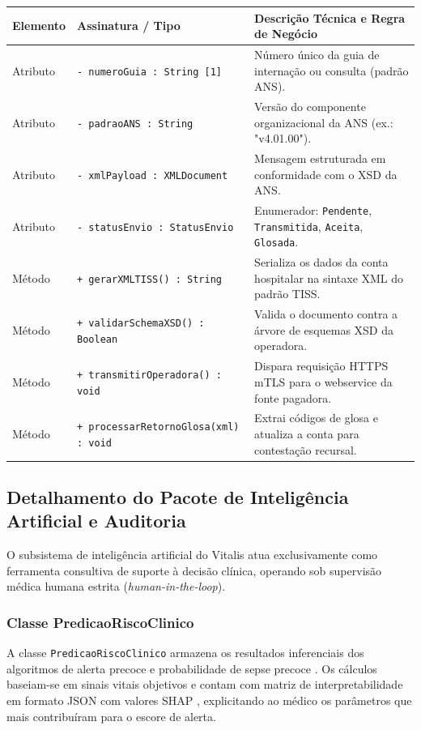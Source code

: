 \begingroup
\small
\noindent\begin{tabularx}{\linewidth}{l >{\raggedright\arraybackslash}p{5.7cm} >{\raggedright\arraybackslash}X}
\toprule
\textbf{Elemento} & \textbf{Assinatura / Tipo} & \textbf{Descrição Técnica e Regra de Negócio} \\
\midrule
Atributo & \texttt{- numeroGuia : String [1]} & Número único da guia de internação ou consulta (padrão ANS). \\
Atributo & \texttt{- padraoANS : String} & Versão do componente organizacional da ANS (ex.: "v4.01.00"). \\
Atributo & \texttt{- xmlPayload : XMLDocument} & Mensagem estruturada em conformidade com o XSD da ANS. \\
Atributo & \texttt{- statusEnvio : StatusEnvio} & Enumerador: \texttt{Pendente}, \texttt{Transmitida}, \texttt{Aceita}, \texttt{Glosada}. \\
\midrule
Método & \texttt{+ gerarXMLTISS() : String} & Serializa os dados da conta hospitalar na sintaxe XML do padrão TISS. \\
Método & \texttt{+ validarSchemaXSD() : Boolean} & Valida o documento contra a árvore de esquemas XSD da operadora. \\
Método & \texttt{+ transmitirOperadora() : void} & Dispara requisição HTTPS mTLS para o webservice da fonte pagadora. \\
Método & \texttt{+ processarRetornoGlosa(xml) : void} & Extrai códigos de glosa e atualiza a conta para contestação recursal. \\
\bottomrule
\end{tabularx}
\endgroup

\subsection{Detalhamento do Pacote de Inteligência Artificial e Auditoria}
\label{subsec:detalhe_ia_auditoria}

O subsistema de inteligência artificial do Vitalis atua exclusivamente como ferramenta consultiva de suporte à decisão clínica, operando sob supervisão médica humana estrita (\textit{human-in-the-loop}).

\subsubsection{Classe PredicaoRiscoClinico}
A classe \texttt{PredicaoRiscoClinico} armazena os resultados inferenciais dos algoritmos de alerta precoce e probabilidade de sepse precoce \cite{singer_sepsis:2016}. Os cálculos baseiam-se em sinais vitais objetivos e contam com matriz de interpretabilidade em formato JSON com valores SHAP \cite{lundberg_shap:2017}, explicitando ao médico os parâmetros que mais contribuíram para o escore de alerta.

